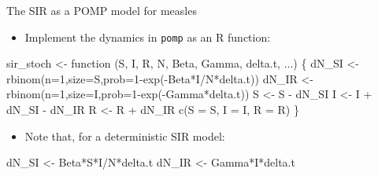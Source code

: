 \documentclass[
  ignorenonframetext,
  aspectratio=169,
  t]{beamer}
\newenvironment{Shaded}{\begin{snugshade}}{\end{snugshade}}
\newcommand{\AttributeTok}[1]{\textcolor[rgb]{0.40,0.45,0.13}{#1}}
\newcommand{\ControlFlowTok}[1]{\textcolor[rgb]{0.00,0.23,0.31}{#1}}
\newcommand{\DecValTok}[1]{\textcolor[rgb]{0.68,0.00,0.00}{#1}}
\newcommand{\FunctionTok}[1]{\textcolor[rgb]{0.28,0.35,0.67}{#1}}
\newcommand{\NormalTok}[1]{\textcolor[rgb]{0.00,0.23,0.31}{#1}}
\newcommand{\OtherTok}[1]{\textcolor[rgb]{0.00,0.23,0.31}{#1}}
\newcommand{\SpecialCharTok}[1]{\textcolor[rgb]{0.37,0.37,0.37}{#1}}
\providecommand{\tightlist}{%
  \setlength{\itemsep}{0pt}\setlength{\parskip}{0pt}}\usepackage{longtable,booktabs,array}
\theoremstyle{definition}
\begin{document}
\begin{frame}{The SIR as a POMP model for
measles}
\begin{itemize}
\tightlist
\item
  Implement the dynamics in \texttt{pomp} as an R function:
\end{itemize}

\begin{Shaded}
\begin{Highlighting}[]
\NormalTok{sir\_stoch }\OtherTok{\textless{}{-}} \ControlFlowTok{function}\NormalTok{ (S, I, R, N, Beta, Gamma, delta.t, ...) \{}
\NormalTok{  dN\_SI }\OtherTok{\textless{}{-}} \FunctionTok{rbinom}\NormalTok{(}\AttributeTok{n=}\DecValTok{1}\NormalTok{,}\AttributeTok{size=}\NormalTok{S,}\AttributeTok{prob=}\DecValTok{1}\SpecialCharTok{{-}}\FunctionTok{exp}\NormalTok{(}\SpecialCharTok{{-}}\NormalTok{Beta}\SpecialCharTok{*}\NormalTok{I}\SpecialCharTok{/}\NormalTok{N}\SpecialCharTok{*}\NormalTok{delta.t))}
\NormalTok{  dN\_IR }\OtherTok{\textless{}{-}} \FunctionTok{rbinom}\NormalTok{(}\AttributeTok{n=}\DecValTok{1}\NormalTok{,}\AttributeTok{size=}\NormalTok{I,}\AttributeTok{prob=}\DecValTok{1}\SpecialCharTok{{-}}\FunctionTok{exp}\NormalTok{(}\SpecialCharTok{{-}}\NormalTok{Gamma}\SpecialCharTok{*}\NormalTok{delta.t))}
\NormalTok{  S }\OtherTok{\textless{}{-}}\NormalTok{ S }\SpecialCharTok{{-}}\NormalTok{ dN\_SI}
\NormalTok{  I }\OtherTok{\textless{}{-}}\NormalTok{ I }\SpecialCharTok{+}\NormalTok{ dN\_SI }\SpecialCharTok{{-}}\NormalTok{ dN\_IR}
\NormalTok{  R }\OtherTok{\textless{}{-}}\NormalTok{ R }\SpecialCharTok{+}\NormalTok{ dN\_IR}
  \FunctionTok{c}\NormalTok{(}\AttributeTok{S =}\NormalTok{ S, }\AttributeTok{I =}\NormalTok{ I, }\AttributeTok{R =}\NormalTok{ R)}
\NormalTok{\}}
\end{Highlighting}
\end{Shaded}

\begin{itemize}
\tightlist
\item
  Note that, for a deterministic SIR model:
\end{itemize}

\begin{Shaded}
\begin{Highlighting}[]
\NormalTok{dN\_SI }\OtherTok{\textless{}{-}}\NormalTok{ Beta}\SpecialCharTok{*}\NormalTok{S}\SpecialCharTok{*}\NormalTok{I}\SpecialCharTok{/}\NormalTok{N}\SpecialCharTok{*}\NormalTok{delta.t}
\NormalTok{dN\_IR }\OtherTok{\textless{}{-}}\NormalTok{ Gamma}\SpecialCharTok{*}\NormalTok{I}\SpecialCharTok{*}\NormalTok{delta.t}
\end{Highlighting}
\end{Shaded}


\end{frame}
\end{document}
